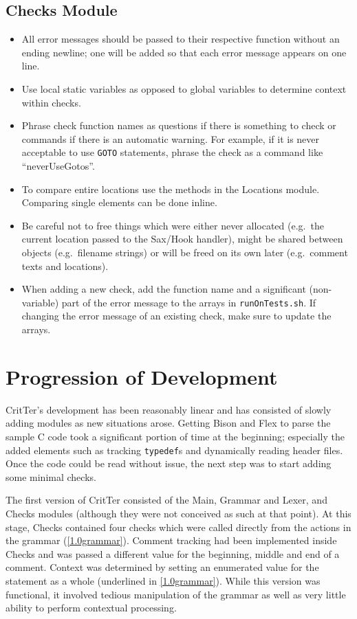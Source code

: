 \documentclass[12pt]{report}
\newcommand{\programName}{CritTer\xspace}
\begin{document}
\section{Checks Module}

\begin{itemize}
\item All error messages should be passed to their respective function without an ending newline; one 
will be added so that each error message appears on one line.
\item Use local static variables as opposed to global variables to determine context within checks.
\item Phrase check function names as questions if there is something to check or commands if there is an automatic warning. For example, if it is never acceptable to use \lstinline{GOTO} statements, phrase the check as a command like ``neverUseGotos''.
\item To compare entire locations use the methods in the Locations module. Comparing single elements can be done inline. 
\item Be careful not to free things which were either never allocated (e.g.\ the current location passed to the Sax\slash Hook handler), might be shared between objects (e.g.\ filename strings) or will be freed on its own later (e.g.\ comment texts and locations).
\item When adding a new check, add the function name and a significant (non-variable) part of the error message to the arrays in \lstinline{runOnTests.sh}. If changing the error message of an existing check, make sure to update the arrays.
\end{itemize}

\chapter{Progression of Development}
\label{progressionOfDevelopment}

\programName's development has been reasonably linear and has consisted of slowly adding modules 
as new situations arose. Getting Bison and Flex to parse the sample C code took a significant portion of 
time at the beginning; especially the added elements such as tracking \lstinline{typedef}s and 
dynamically reading header files. Once the code could be read without issue, the next step was to start 
adding some minimal checks.

The first version of \programName consisted of the Main, Grammar and Lexer, and Checks modules 
(although they were not conceived as such at that point). At this stage, Checks contained four checks 
which were called directly from the actions in the grammar (\autoref{1.0grammar}). Comment tracking 
had been implemented inside Checks and was passed a different value for the beginning, middle and 
end of a comment. Context was determined by setting an enumerated value for the statement as a whole 
(underlined in \autoref{1.0grammar}). While this version was functional, it involved tedious manipulation 
of the grammar as well as very little ability to perform contextual processing.
\end{document}
